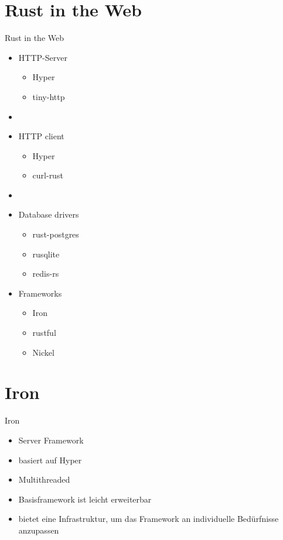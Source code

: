 \documentclass{beamer}
\begin{document}
\section{Rust in the Web}

\begin{frame}{Rust in the Web}

\begin{minipage}[t]{.45\textwidth}
\begin{itemize}
  \item HTTP-Server
  \begin{itemize}
    \item Hyper
    \item tiny-http
  \end{itemize}
  \item []
  \item HTTP client
  \begin{itemize}
    \item Hyper
    \item curl-rust
  \end{itemize} 
  \item []
  \item Database drivers
  \begin{itemize}
    \item rust-postgres
    \item rusqlite
    \item redis-rs
  \end{itemize}
\end{itemize}
\end{minipage}
\hfill
\begin{minipage}[t]{.45\textwidth}
\begin{itemize}
\item Frameworks
  \begin{itemize}
    \item Iron
    \item rustful
    \item Nickel
  \end{itemize}  
\end{itemize}
\end{minipage}

\end{frame}

\section{Iron}
\begin{frame}{Iron}
\begin{itemize}
    \item Server Framework
    \item basiert auf Hyper
    \item Multithreaded
    \item Basisframework ist leicht erweiterbar
    \item bietet eine Infrastruktur, um das Framework an individuelle Bedürfnisse anzupassen
\end{itemize}
\end{frame}
\end{document}
